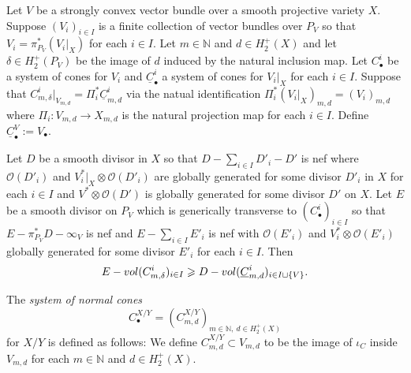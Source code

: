 \documentclass[10pt,a4paper]{amsart}
\newcommand{\Vol}{\textnormal{-vol}}
\newcommand{\bN}{\mathbb{N}}
\newcommand{\calO}{\mathcal{O}}
\renewcommand{\geq}{\geqslant}
\begin{document}
\begin{prop} \label{propcurvesincompatificationsofconvexvecctorbundles}
	Let $V$ be a strongly convex vector bundle over a smooth projective variety $X$.
	Suppose $(V_i)_{i \in I}$ is a finite collection of vector bundles over $P_V$ so that $V_i = \pi_{P_V}^*(V_i|_X)$ for each $i \in I$.
	Let $m \in \bN$ and $d \in H_2^+(X)$ and let $\delta \in H_2^+(P_V)$ be the image of $d$ induced by the natural inclusion map.
	Let $C^i_\bullet$ be a system  of cones for $V_i$ and $\underline{C}^i_\bullet$ a system of cones for $V_i|_X$ for each $i \in I$. Suppose that $C^i_{m,\delta}|_{V_{m,d}} = \Pi_i^*\underline{C}^i_{m,d}$ via the natual identification $\Pi_i^*(V_i|_X)_{m,d} = (V_i)_{m,d}$ where $\Pi_i : V_{m,d} \to X_{m,d}$ is the natural projection map for each $i \in I$.
	Define $\underline{C}^V_\bullet := V_\bullet$.

	Let $D$ be a smooth divisor in $X$ so that $D-\sum_{i \in I} D'_i - D'$ is nef where $\calO(D'_i)$ and $V_i^*|_X \otimes \calO(D'_i)$ are globally generated for some divisor $D'_i$ in $X$ for each $i \in I$ and $V^* \otimes \calO(D')$ is globally generated for some divisor $D'$ on $X$.
	Let $E$ be a smooth divisor on $P_V$ which is generically transverse to $(C^i_\bullet)_{i \in I}$ so that $E - \pi_{P_V}^*D - \infty_V$ is nef
	and $E - \sum_{i \in I} E'_i$ is nef with $\calO(E'_i)$ and $V_i^* \otimes \calO(E'_i)$ globally generated for some divisor $E'_i$ for each $i \in I$.
	Then
	\begin{equation}
		E\Vol(C^i_{m,\delta})_{i \in I} \geq D\Vol(\underline{C}^i_{m,d})_{i \in I \sqcup \{V\}}.
	\end{equation}
\end{prop}

\begin{defn} \label{defnsystemofnormalcones}
	The \emph{system of normal cones}
	\begin{equation}
		C^{X/Y}_\bullet = (C^{X/Y}_{m,d})_{m \in \bN, \ d \in H_2^+(X)}
	\end{equation}
	for $X/Y$ is defined as follows:
	We define $C^{X/Y}_{m,d} \subset V_{m,d}$
	to be the image of $\iota_C$ inside $V_{m,d}$ for each $m \in \bN$ and $d \in H_2^+(X)$.
\end{defn}
\end{document}
